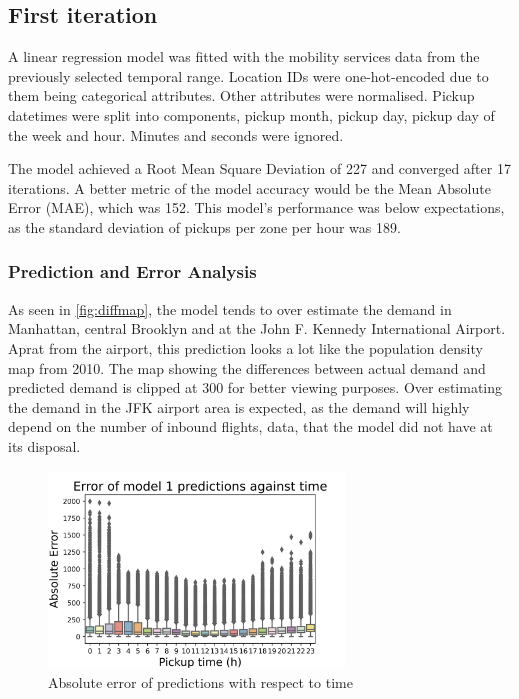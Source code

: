 \documentclass[11pt]{article}
\begin{document}
\subsection{First iteration}
A linear regression model was fitted with the mobility services data from the previously selected temporal range. Location IDs were one-hot-encoded due to them being categorical attributes. Other attributes were normalised. Pickup datetimes were split into components, pickup month, pickup day, pickup day of the week and hour. Minutes and seconds were ignored.


The model achieved a Root Mean Square Deviation of 227 and converged after 17 iterations. A better metric of the model accuracy would be the Mean Absolute Error (MAE), which was 152. This model's performance was below expectations, as the standard deviation of pickups per zone per hour was 189. 


\subsubsection{Prediction and Error Analysis}


As seen in \autoref{fig:diffmap}, the model tends to over estimate the demand in Manhattan, central Brooklyn and at the John F. Kennedy International Airport. Aprat from the airport, this prediction looks a lot like the population density map \cite{key} from 2010. The map showing the differences between actual demand and predicted demand is clipped at 300 for better viewing purposes. Over estimating the demand in the JFK airport area is expected, as the demand will highly depend on the number of inbound flights, data, that the model did not have at its disposal.

\begin{figure}
    \includegraphics[width=0.70\textwidth]{model1_error_hour.jpeg}
    \centering
    \caption{Absolute error of predictions with respect to time} \label{fig:maemodel1}
\end{figure}
\end{document}

